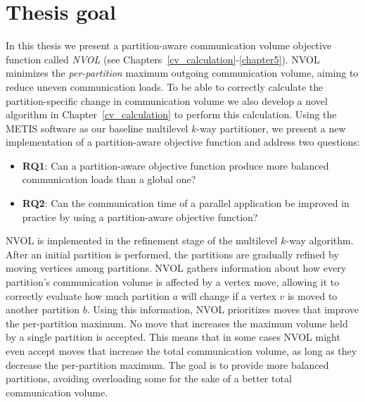 \section{Thesis goal}
 In this thesis we present a partition-aware communication volume objective function called \textit{NVOL} (see Chapters~\ref{cv_calculation}-\ref{chapter5}). NVOL minimizes the \textit{per-partition} maximum outgoing communication volume, aiming to reduce uneven communication loads. To be able to correctly calculate the partition-specific change in communication volume we also develop a novel algorithm in Chapter~\ref{cv_calculation} to perform this calculation. Using the METIS software as our baseline multilevel $k$-way partitioner, we present a new implementation of a partition-aware objective function and address two questions: 
\begin{itemize}
	\item \textbf{RQ1}: Can a partition-aware objective function produce more balanced communication loads than a global one?
	\item \textbf{RQ2}: Can the communication time of a parallel application be improved in practice by using a partition-aware objective function?
\end{itemize}

NVOL is implemented in the refinement stage of the multilevel $k$-way algorithm. After an initial partition is performed, the partitions are gradually refined by moving vertices among partitions. NVOL gathers information about how every partition's communication volume is affected by a vertex move, allowing it to correctly evaluate how much partition $a$ will change if a vertex $v$ is moved to another partition $b$. Using this information, NVOL prioritizes moves that improve the per-partition maximum. No move that increases the maximum volume held by a single partition is accepted. This means that in some cases NVOL might even accept moves that increase the total communication volume, as long as they decrease the per-partition maximum. The goal is to provide more balanced partitions, avoiding overloading some for the sake of a better total communication volume.

